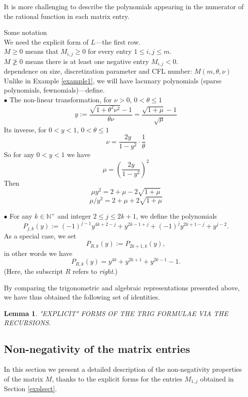 \documentclass[a4paper]{article}
\newtheorem{lemma}{Lemma}
\newcommand{\te}{\theta}
\newcommand{\nplus}{\mathbb{N}^+}
\newcommand{\Por}{P_{R,k}(y)}
\begin{document}
\bigskip

It is more challenging to describe the polynomials appearing in the numerator of the rational function in each matrix entry. 

Some notation \\

 We need the explicit form of $L$---the first row.\\

$M\ge 0$ means that  $M_{i,j}\ge 0$ for every entry $1\le i, j\le m$.\\

$M\not\ge 0$ means there is at least one negative entry $M_{i,j}<0$.\\

dependence on size, discretization parameter and CFL number: $M(m,\te,\nu)$\\

Unlike in Example \ref{example1}, we will have lacunary polynomials (sparse polynomials, fewnomials)---define.\\


$\bullet$ The non-linear transformation, for $\nu>0$, $0<\te\le 1$
\[
y:=\frac{\sqrt{1+\te^2\nu^2}-1}{\te\nu}=\frac{\sqrt{1+\mu}-1}{\sqrt{\mu}}
\]
Its inverse, for $0<y<1$, $0<\te\le 1$
\[
\nu=\frac{2y}{1-y^2}\cdot\frac{1}{\te}
\]
So for any $0<y<1$ we have
\[
\mu=\left(\frac{2y}{1-y^2}\right)^2
\]
Then
\[\mu y^2=2+\mu-2\sqrt{1+\mu}\]
\[\mu/y^2=2+\mu+2\sqrt{1+\mu}\]

$\bullet$ For any $k\in\nplus$ and integer $2\le j\le 2k+1$, we define the polynomials
\[
P_{j,k}(y):=(-1)^{j-1} y^{4 k+2-j}+y^{2 k-1+j}+(-1)^j y^{2 k+1-j}+y^{j-2}.
\]
As a special case, we set
\[
\Por:=P_{2k+1,k}(y),
\]
in other words we have
\[\Por=y^{4 k}+y^{2 k+1}+y^{2 k-1}-1.\]
(Here, the subscript $R$ refers to \textit{right}.)

By comparing the trigonometric and algebraic representations presented above, we have thus obtained the following set of identities. 
\begin{lemma}
"EXPLICIT" FORMS OF THE TRIG FORMULAE VIA THE RECURSIONS.
\end{lemma}

\subsection{Non-negativity of the matrix entries}

In this section we present a detailed description of the non-negativity properties of the matrix $M$, thanks to the explicit forms for the entries $M_{1,j}$ obtained in Section \ref{explsect}.
\end{document}

